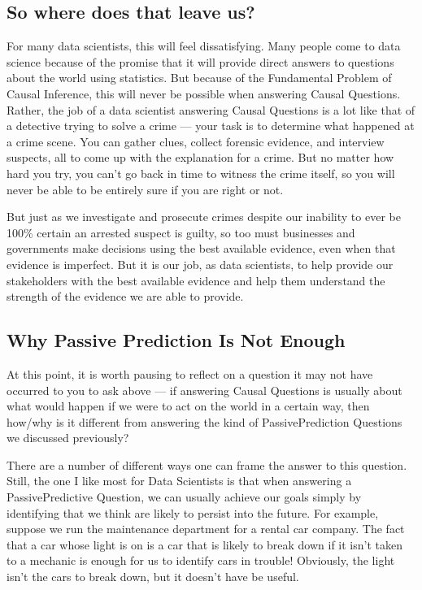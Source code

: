 \documentclass[letterpaper,10pt,english]{jupyterBook}
\begin{document}
\subsection{So where does that leave us?}
\label{\detokenize{30_questions/40_answering_causal_questions:so-where-does-that-leave-us}}
\sphinxAtStartPar
For many data scientists, this will feel  dissatisfying. Many people come to data science because of the promise that it will provide direct answers to questions about the world using statistics. But because of the Fundamental Problem of Causal Inference, this will never be possible when answering Causal Questions. Rather, the job of a data scientist answering Causal Questions is a lot like that of a detective trying to solve a crime — your task is to determine what  happened at a crime scene. You can gather clues, collect forensic evidence, and interview suspects, all to come up with the  explanation for a crime. But no matter how hard you try, you can’t go back in time to witness the crime itself, so you will never be able to be entirely sure if you are right or not.

\sphinxAtStartPar
But just as we investigate and prosecute crimes despite our inability to ever be 100\% certain an arrested suspect is guilty, so too must businesses and governments make decisions using the best available evidence, even when that evidence is imperfect. But it is our job, as data scientists, to help provide our stakeholders with the best available evidence and help them understand the strength of the evidence we are able to provide.


\subsection{Why Passive Prediction Is Not Enough}
\label{\detokenize{30_questions/40_answering_causal_questions:why-passive-prediction-is-not-enough}}
\sphinxAtStartPar
At this point, it is worth pausing to reflect on a question it may not have occurred to you to ask above — if answering Causal Questions is usually about  what would happen if we were to act on the world in a certain way, then how/why is it different from answering the kind of Passive\sphinxhyphen{}Prediction Questions we discussed previously?

\sphinxAtStartPar
There are a number of different ways one can frame the answer to this question. Still, the one I like most for Data Scientists is that when answering a Passive\sphinxhyphen{}Predictive Question, we can usually achieve our goals simply by identifying  that we think are likely to persist into the future. For example, suppose we run the maintenance department for a rental car company. The fact that a car whose  light is on is a car that is likely to break down if it isn’t taken to a mechanic is enough for us to identify cars in trouble! Obviously, the  light isn’t  the cars to break down, but it doesn’t have be useful.
\end{document}
